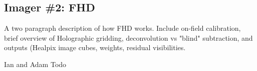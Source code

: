 \subsection{Imager \#2: FHD}
A two paragraph description of how FHD works. Include on-field calibration, brief overview of Holographic gridding, deconvolution vs "blind" subtraction, and outputs (Healpix image cubes, weights, residual visibilities.

Ian and Adam Todo